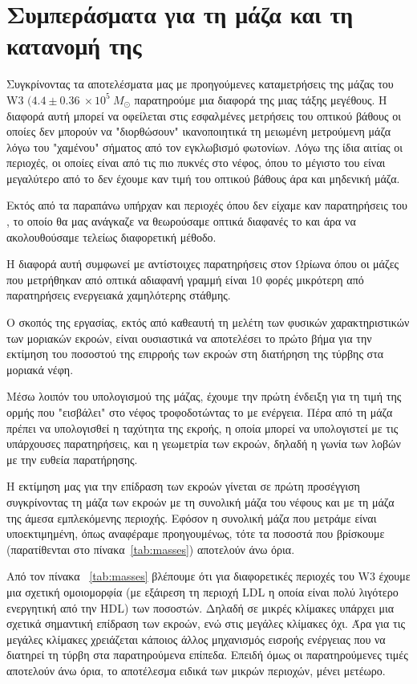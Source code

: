 \documentclass[a4paper,12pt]{memoir}
\newcommand{\e}[1]{\times 10^{#1}}
\begin{document}
\section{Συμπεράσματα για τη μάζα και τη κατανομή της}
Συγκρίνοντας τα αποτελέσματα μας με προηγούμενες καταμετρήσεις της μάζας του W3 $(4.4\pm 0.36 \: \e{5} \ M_{\odot}$ \cite{moore_2007,polychroni_gas_2012} παρατηρούμε μια διαφορά της μιας τάξης μεγέθους. Η διαφορά αυτή μπορεί να οφείλεται στις εσφαλμένες μετρήσεις του οπτικού βάθους οι οποίες δεν μπορούν να "διορθώσουν" ικανοποιητικά τη μειωμένη μετρούμενη μάζα λόγω του "χαμένου" σήματος από τον εγκλωβισμό φωτονίων. Λόγω της ίδια αιτίας οι περιοχές, οι οποίες είναι από τις πιο πυκνές στο νέφος, όπου το μέγιστο του  είναι μεγαλύτερο από το  δεν έχουμε καν τιμή του οπτικού βάθους άρα και μηδενική μάζα.

Εκτός από τα παραπάνω υπήρχαν και περιοχές όπου δεν είχαμε καν παρατηρήσεις του , το οποίο θα μας ανάγκαζε να θεωρούσαμε οπτικά διαφανές το  και άρα να ακολουθούσαμε τελείως διαφορετική μέθοδο.

Η διαφορά αυτή συμφωνεί με αντίστοιχες παρατηρήσεις στον Ωρίωνα \cite{buckle_2010} όπου οι μάζες που μετρήθηκαν από οπτικά αδιαφανή γραμμή   είναι 10 φορές μικρότερη από παρατηρήσεις ενεργειακά χαμηλότερης στάθμης.

Ο σκοπός της εργασίας, εκτός από καθεαυτή τη μελέτη των φυσικών χαρακτηριστικών των μοριακών εκροών, είναι ουσιαστικά να αποτελέσει το πρώτο βήμα για την εκτίμηση του ποσοστού της επιρροής των εκροών στη διατήρηση της τύρβης στα μοριακά νέφη.

Μέσω λοιπόν του υπολογισμού της μάζας, έχουμε την πρώτη ένδειξη για τη τιμή της ορμής που "εισβάλει" στο νέφος  τροφοδοτώντας το με ενέργεια. Πέρα από τη μάζα πρέπει να υπολογισθεί η ταχύτητα της εκροής, η οποία μπορεί να υπολογιστεί με τις υπάρχουσες παρατηρήσεις, και η γεωμετρία των εκροών, δηλαδή η γωνία των λοβών με την ευθεία παρατήρησης. 

Η εκτίμηση μας για την επίδραση των εκροών γίνεται σε πρώτη προσέγγιση συγκρίνοντας τη μάζα των εκροών με τη συνολική μάζα του νέφους και με τη μάζα της άμεσα εμπλεκόμενης περιοχής.
Εφόσον η συνολική μάζα που μετράμε είναι υποεκτιμημένη, όπως αναφέραμε προηγουμένως, τότε τα ποσοστά που βρίσκουμε (παρατίθενται στο πίνακα~\ref{tab:masses}) αποτελούν άνω όρια.

Από τον πίνακα ~\ref{tab:masses} βλέπουμε ότι για διαφορετικές περιοχές του W3 έχουμε μια σχετική ομοιομορφία (με εξάιρεση τη περιοχή LDL η οποία είναι πολύ λιγότερο ενεργητική από την HDL) των ποσοστών. Δηλαδή σε μικρές κλίμακες υπάρχει μια σχετικά σημαντική επίδραση των εκροών, ενώ στις μεγάλες κλίμακες όχι. Άρα για τις μεγάλες κλίμακες χρειάζεται κάποιος άλλος μηχανισμός εισροής ενέργειας που να διατηρεί τη τύρβη στα παρατηρούμενα επίπεδα. Επειδή όμως οι παρατηρούμενες τιμές αποτελούν άνω όρια, το αποτέλεσμα ειδικά των μικρών περιοχών, μένει μετέωρο. 
 
\end{document}
